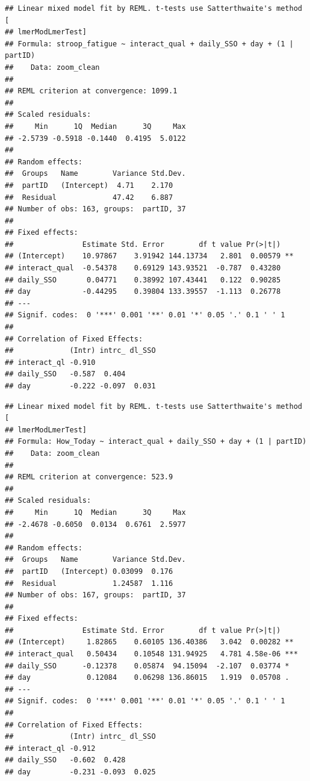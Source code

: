 \documentclass[
  english,
  man]{apa7}
\begin{document}
\begin{verbatim}
## Linear mixed model fit by REML. t-tests use Satterthwaite's method [
## lmerModLmerTest]
## Formula: stroop_fatigue ~ interact_qual + daily_SSO + day + (1 | partID)
##    Data: zoom_clean
## 
## REML criterion at convergence: 1099.1
## 
## Scaled residuals: 
##     Min      1Q  Median      3Q     Max 
## -2.5739 -0.5918 -0.1440  0.4195  5.0122 
## 
## Random effects:
##  Groups   Name        Variance Std.Dev.
##  partID   (Intercept)  4.71    2.170   
##  Residual             47.42    6.887   
## Number of obs: 163, groups:  partID, 37
## 
## Fixed effects:
##                Estimate Std. Error        df t value Pr(>|t|)   
## (Intercept)    10.97867    3.91942 144.13734   2.801  0.00579 **
## interact_qual  -0.54378    0.69129 143.93521  -0.787  0.43280   
## daily_SSO       0.04771    0.38992 107.43441   0.122  0.90285   
## day            -0.44295    0.39804 133.39557  -1.113  0.26778   
## ---
## Signif. codes:  0 '***' 0.001 '**' 0.01 '*' 0.05 '.' 0.1 ' ' 1
## 
## Correlation of Fixed Effects:
##             (Intr) intrc_ dl_SSO
## interact_ql -0.910              
## daily_SSO   -0.587  0.404       
## day         -0.222 -0.097  0.031
\end{verbatim}

\begin{verbatim}
## Linear mixed model fit by REML. t-tests use Satterthwaite's method [
## lmerModLmerTest]
## Formula: How_Today ~ interact_qual + daily_SSO + day + (1 | partID)
##    Data: zoom_clean
## 
## REML criterion at convergence: 523.9
## 
## Scaled residuals: 
##     Min      1Q  Median      3Q     Max 
## -2.4678 -0.6050  0.0134  0.6761  2.5977 
## 
## Random effects:
##  Groups   Name        Variance Std.Dev.
##  partID   (Intercept) 0.03099  0.176   
##  Residual             1.24587  1.116   
## Number of obs: 167, groups:  partID, 37
## 
## Fixed effects:
##                Estimate Std. Error        df t value Pr(>|t|)    
## (Intercept)     1.82865    0.60105 136.40386   3.042  0.00282 ** 
## interact_qual   0.50434    0.10548 131.94925   4.781 4.58e-06 ***
## daily_SSO      -0.12378    0.05874  94.15094  -2.107  0.03774 *  
## day             0.12084    0.06298 136.86015   1.919  0.05708 .  
## ---
## Signif. codes:  0 '***' 0.001 '**' 0.01 '*' 0.05 '.' 0.1 ' ' 1
## 
## Correlation of Fixed Effects:
##             (Intr) intrc_ dl_SSO
## interact_ql -0.912              
## daily_SSO   -0.602  0.428       
## day         -0.231 -0.093  0.025
\end{verbatim}
\end{document}
